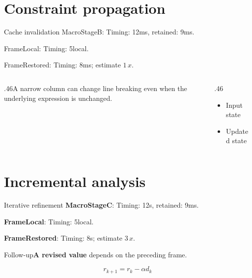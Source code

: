 \documentclass[11pt,aspectratio=43]{beamer}
\newcommand{\fuzzlayerA}[1]{\textrm{#1}}
\newcommand{\fuzzlayerB}[1]{\fuzzlayerA{#1}}
\newcommand{\fuzzterm}[1]{\fuzzlayerB{#1}}
\newcommand{\fuzzpair}[2]{\fuzzterm{#1}: #2}
\newcommand{\fuzzunit}{ms}
\let\fuzzoriginalunit\fuzzunit
\newcommand{\fuzzcoefficient}{1}
\newcommand{\fuzzscale}[2][\fuzzcoefficient]{#1\,#2}
\begin{document}
\section{Constraint propagation}
\begin{frame}[t]{Cache invalidation}
\fuzzpair{MacroStageB}{Timing: 12\fuzzunit, retained: 9\fuzzoriginalunit.}\par
{\renewcommand{\fuzzunit}{local}\fuzzpair{FrameLocal}{Timing: 5\fuzzunit.}\par}
\fuzzpair{FrameRestored}{Timing: 8\fuzzunit; estimate $\fuzzscale{x}$.}\par
\begin{columns}[T]\begin{column}{.46\textwidth}A narrow column can change line breaking even when the underlying expression is unchanged.\end{column}\begin{column}{.46\textwidth}\begin{itemize}\item Input state\item Updated state\end{itemize}\end{column}\end{columns}
\end{frame}
\renewcommand{\fuzzunit}{s}
\renewcommand{\fuzzcoefficient}{3}
\renewcommand{\fuzzterm}[1]{{\textbf{#1}}}
\section{Incremental analysis}
\begin{frame}[t]{Iterative refinement}
\fuzzpair{MacroStageC}{Timing: 12\fuzzunit, retained: 9\fuzzoriginalunit.}\par
{\renewcommand{\fuzzunit}{local}\fuzzpair{FrameLocal}{Timing: 5\fuzzunit.}\par}
\fuzzpair{FrameRestored}{Timing: 8\fuzzunit; estimate $\fuzzscale{x}$.}\par
\begin{block}{Follow-up}\fuzzterm{A revised value} depends on the preceding frame.\end{block}
\[r_{k+1}=r_k-\alpha d_k\]
\end{frame}
\renewcommand{\fuzzunit}{min}
\renewcommand{\fuzzcoefficient}{4}
\renewcommand{\fuzzterm}[1]{{\textrm{#1}}}
\end{document}
